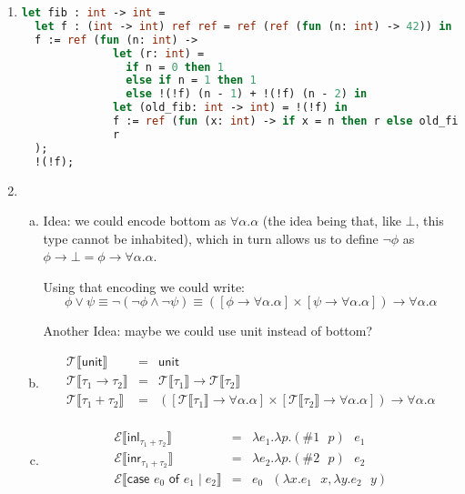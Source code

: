 \documentclass[10pt, oneside]{article}
\begin{document}
\begin{enumerate}[1.]
	\item
	\begin{lstlisting}[language = ML]
let fib : int -> int = 
  let f : (int -> int) ref ref = ref (ref (fun (n: int) -> 42)) in 
  f := ref (fun (n: int) -> 
              let (r: int) = 
                if n = 0 then 1
                else if n = 1 then 1
                else !(!f) (n - 1) + !(!f) (n - 2) in
              let (old_fib: int -> int) = !(!f) in
              f := ref (fun (x: int) -> if x = n then r else old_fib x);
              r
  );
  !(!f);
	\end{lstlisting}

	\item
	\begin{enumerate}[(a)]
		\item Idea: we could encode bottom as $\forall \alpha. \alpha$ (the idea being
					that, like $\bot$, this type cannot be inhabited), which in turn 
					allows us to define $\neg \phi$ as $\phi \rightarrow \bot = \phi
					\rightarrow \forall \alpha. \alpha$.
					
					Using that encoding we could write: 
					$$\phi \vee \psi \equiv \neg (\neg \phi \wedge \neg \psi)
						\equiv ([\phi \rightarrow \forall \alpha. \alpha] \times [\psi \rightarrow \forall \alpha. \alpha]) \rightarrow \forall \alpha. \alpha$$
						
					Another Idea: maybe we could use unit instead of bottom?
		\item
		\begin{eqnarray*}
			\mathcal{T} \llbracket \textsf{unit} \rrbracket & = & \textsf{unit} \\
			\mathcal{T} \llbracket \tau_1 \rightarrow \tau_2 \rrbracket & = & \mathcal{T} \llbracket \tau_1 \rrbracket \rightarrow \mathcal{T} \llbracket \tau_2 \rrbracket \\
			\mathcal{T} \llbracket \tau_1 + \tau_2 \rrbracket & = & ([\mathcal{T} \llbracket \tau_1 \rrbracket \rightarrow \forall \alpha. \alpha] \times [\mathcal{T} \llbracket \tau_2 \rrbracket \rightarrow \forall \alpha. \alpha]) \rightarrow \forall \alpha. \alpha \\
		\end{eqnarray*}
		\item
		\begin{eqnarray*}
			\mathcal{E} \llbracket \textsf{inl}_{\tau_1 + \tau_2} \rrbracket & = & \lambda e_1. \lambda p. (\#1 \text{ } p) \text{ } e_1\\
			\mathcal{E} \llbracket \textsf{inr}_{\tau_1 + \tau_2} \rrbracket & = & \lambda e_2. \lambda p. (\#2 \text{ } p) \text{ } e_2\\
			\mathcal{E} \llbracket \textsf{case } e_0 \textsf{ of } e_1 \mid e_2 \rrbracket & = & e_0 \text{ } (\lambda x. e_1 \text{ } x, \lambda y. e_2 \text{ } y)\\
		\end{eqnarray*}
	\end{enumerate}


\end{enumerate}
\end{document}
